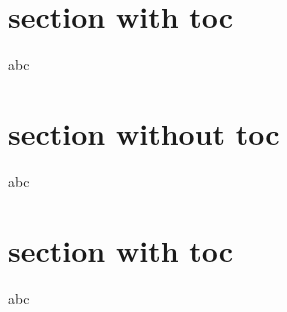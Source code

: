 \documentclass{beamer}
\begin{document}
\section{section with toc}  
\begin{frame}
    abc
\end{frame} 

\begingroup
    \AtBeginSection[]{}
    \section{section without toc}   
    \begin{frame}
        abc
    \end{frame} 
\endgroup

\section{section with toc}  
\begin{frame}
    abc
\end{frame} 
\end{document}
